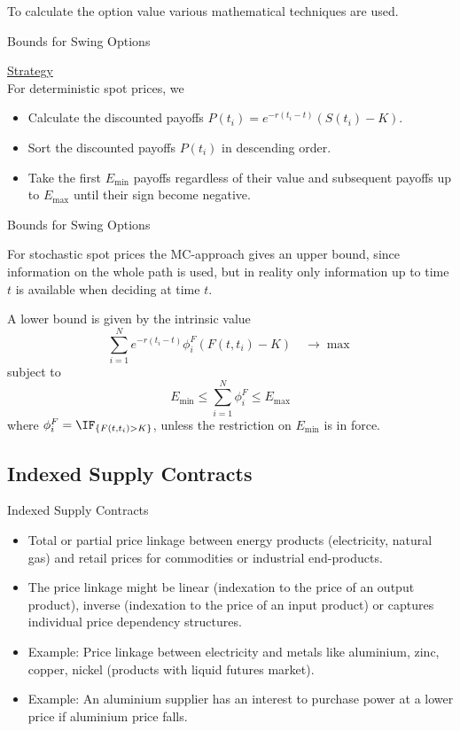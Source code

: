 To calculate the option value various mathematical techniques are used.

{Bounds for Swing Options}

\underline{Strategy}\\
For deterministic spot prices, we
\begin{itemize}
  \item  Calculate the discounted payoffs
  $P(t_i)=e^{-r(t_i-t)}(S(t_i)-K)$.
  \item  Sort the discounted payoffs $P(t_i)$ in descending order.
  \item Take the first $E_{\min}$ payoffs regardless of their
  value and subsequent payoffs up to $E_{\max}$ until their sign
  become negative.
\end{itemize}

{Bounds for Swing Options}

For stochastic spot prices the MC-approach gives an upper bound,
since information on the whole path is used, but in reality only
information up to time $t$ is available when deciding at time $t$.

A lower bound is given by the intrinsic value
$$\sum_{i=1}^Ne^{-r(t_i-t)} \phi_i^F (F(t,t_i)-K) \quad\rightarrow\max$$
subject to $$E_{\min}\leq\sum_{i=1}^N\phi^F_i\leq E_{\max}$$
where $\phi_i^F=\IF_{\{F(t,t_i)>K\}}$, unless the restriction on $E_{\min}$ is in force.

\subsection{Indexed Supply Contracts}

{Indexed Supply Contracts}
\begin{itemize}
  \item<1-> Total or partial price linkage between energy products (electricity, natural gas) and retail prices for commodities or industrial end-products.
  \item<2-> The price linkage might be linear (indexation to the price of an output product), inverse (indexation to the price of an input product) or captures individual price dependency structures.
  \item<3-> Example: Price linkage between electricity and metals like aluminium, zinc, copper, nickel (products with liquid futures market).
  \item<4-> Example: An aluminium supplier has an interest to purchase power at a lower price if aluminium price falls.
\end{itemize}

